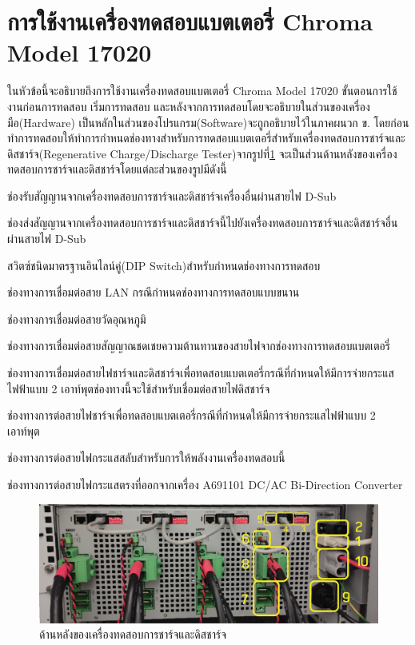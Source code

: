 \section{การใช้งานเครื่องทดสอบแบตเตอรี่ Chroma Model 17020}
ในหัวข้อนี้จะอธิบายถึงการใช้งานเครื่องทดสอบแบตเตอรี่ Chroma Model 17020 ขั้นตอนการใช้งานก่อนการทดสอบ เริ่มการทดสอบ และหลังจากการทดสอบโดยจะอธิบายในส่วนของเครื่องมือ(Hardware)
เป็นหลักในส่วนของโปรแกรม(Software)จะถูกอธิบายไว้ในภาคผนวก ข. โดยก่อนทำการทดสอบให้ทำการกำหนดช่องทางสำหรับการทดสอบแบตเตอรี่สำหรับเครื่องทดสอบการชาร์จและดิสชาร์จ(Regenerative Charge/Discharge Tester)จากรูปที่\ref{fig:Rear_Panel} จะเป็นส่วนด้านหลังของเครื่องทดสอบการชาร์จและดิสชาร์จโดยแต่ละส่วนของรูปมีดังนี้
\begin{enumerate}
{\item ช่องรับสัญญานจากเครื่องทดสอบการชาร์จและดิสชาร์จเครื่องอื่นผ่านสายไฟ D-Sub}
{\item ช่องส่งสัญญานจากเครื่องทดสอบการชาร์จและดิสชาร์จนี้ไปยังเครื่องทดสอบการชาร์จและดิสชาร์จอื่นผ่านสายไฟ D-Sub}
{\item สวิตซ์ชนิดมาตรฐานอินไลน์คู่(DIP Switch)สำหรับกำหนดช่องทางการทดสอบ}
{\item ช่องทางการเชื่อมต่อสาย LAN กรณีกำหนดช่องทางการทดสอบแบบขนาน}
{\item ช่องทางการเชื่อมต่อสายวัดอุณหภูมิ}
{\item ช่องทางการเชื่อมต่อสายสัญญาณชดเชยความต้านทานของสายไฟจากช่องทางการทดสอบแบตเตอรี่}
{\item ช่องทางการเชื่อมต่อสายไฟชาร์จและดิสชาร์จเพื่อทดสอบแบตเตอรี่กรณีที่กำหนดให้มีการจ่ายกระแสไฟฟ้าแบบ 2 เอาท์พุตช่องทางนี้จะใช้สำหรับเชื่อมต่อสายไฟดิสชาร์จ}
{\item ช่องทางการต่อสายไฟชาร์จเพื่อทดสอบแบตเตอรี่กรณีที่กำหนดให้มีการจ่ายกระแสไฟฟ้าแบบ 2 เอาท์พุต}
{\item ช่องทางการต่อสายไฟกระแสสลับสำหรับการให้พลังงานเครื่องทดสอบนี้}
{\item ช่องทางการต่อสายไฟกระแสตรงที่ออกจากเครื่อง A691101 DC/AC Bi-Direction Converter}
\end{enumerate}
\begin{center}
	\begin{figure}[H]
		\includegraphics[width=1\linewidth]{Chapters/img/Rear_Panel_Connection.png}
		\centering
		\captionsetup{justification=centering,margin=2cm}
		\caption{ด้านหลังของเครื่องทดสอบการชาร์จและดิสชาร์จ}
		\label{fig:Rear_Panel}
	\end{figure}
\end{center}
